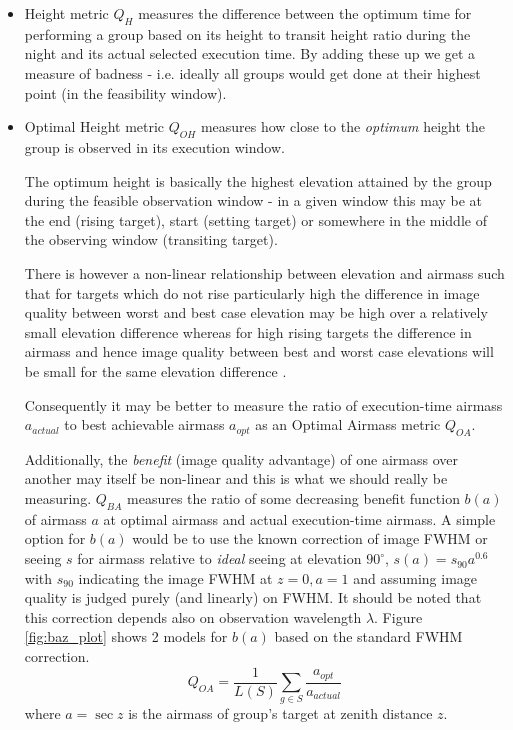 \begin{itemize}
\item Height metric $Q_H$ measures the difference between the optimum time for performing a group based on its height to transit height ratio during the night and its actual selected execution time. By adding these up we get a measure of badness - i.e. ideally all groups would get done at their highest point (in the feasibility window).

\item Optimal Height metric $Q_{OH}$ measures how close to the \emph{optimum} height the group is observed in its execution window. 

The optimum height is basically the highest elevation attained by the group during the feasible observation window - in a given window this may be at the end (rising target), start (setting target) or somewhere in the middle of the observing window (transiting target). 

There is however a non-linear relationship between elevation and airmass such that for targets which do not rise particularly high the difference in image quality between worst and best case elevation may be high over a relatively small elevation difference whereas for high rising targets the difference in airmass and hence image quality between best and worst case elevations will be small for the same elevation difference .



Consequently it may be better to measure the ratio of execution-time airmass $a_{actual}$ to best achievable airmass $a_{opt}$ as an Optimal Airmass metric $Q_{OA}$. 

Additionally, the \emph{benefit} (image quality advantage) of one airmass over another may itself be non-linear and this is what we should really be measuring. $Q_{BA}$ measures the ratio of some decreasing benefit function $b(a)$ of airmass $a$ at optimal airmass and actual execution-time airmass. A simple option for $b(a)$ would be to use the known correction  \cite{standard airmass/wavelength correction paper} of image FWHM or seeing $s$ for airmass relative to \emph{ideal} seeing at elevation $90^\circ$, $s(a)=s_{90}a^{0.6}$ with $s_{90}$ indicating the image FWHM at $z=0,a=1$ and assuming image quality is judged purely (and linearly) on FWHM. It should be noted that this correction depends also on observation wavelength $\lambda$. Figure \ref{fig:baz_plot} shows 2 models for $b(a)$ based on the standard FWHM correction.
\begin{equation}
Q_{OA} = \frac{1}{L(S)}\sum_{g \in S}{\frac{a_{opt}}{a_{actual}}}
\end{equation}
where $a = \sec{z}$ is the airmass of group's target at zenith distance $z$.


\end{itemize}
